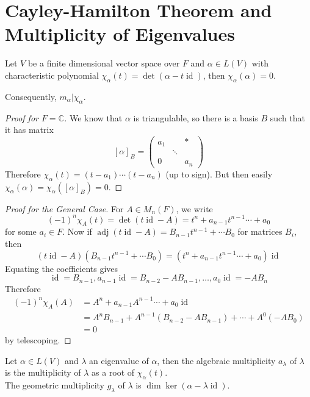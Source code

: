 \section{Cayley-Hamilton Theorem and Multiplicity of Eigenvalues}
\begin{theorem}
    Let $V$ be a finite dimensional vector space over $F$ and $\alpha\in L(V)$ with characteristic polynomial $\chi_\alpha(t)=\det(\alpha-t\operatorname{id})$, then $\chi_\alpha(\alpha)=0$.
\end{theorem}
Consequently, $m_\alpha|\chi_\alpha$.
\begin{proof}[Proof for $F=\mathbb C$]
    We know that $\alpha$ is triangulable, so there is a basis $B$ such that it has matrix
    $$[\alpha]_B=\begin{pmatrix}
        a_1&&\ast\\
        &\ddots&\\
        0&&a_n
    \end{pmatrix}$$
    Therefore $\chi_\alpha(t)=(t-a_1)\cdots (t-a_n)$ (up to sign).
    But then easily $\chi_\alpha(\alpha)=\chi_\alpha([\alpha]_B)=0$.
\end{proof}
\begin{proof}[Proof for the General Case]
    For $A\in M_n(F)$, we write
    $$(-1)^n\chi_A(t)=\det(t\operatorname{id}-A)=t^n+a_{n-1}t^{n-1}\cdots+a_0$$
    for some $a_i\in F$.
    Now if $\operatorname{adj}(t\operatorname{id}-A)=B_{n-1}t^{n-1}+\cdots B_0$ for matrices $B_i$, then
    $$(t\operatorname{id}-A)(B_{n-1}t^{n-1}+\cdots B_0)=(t^n+a_{n-1}t^{n-1}\cdots+a_0)\operatorname{id}$$
    Equating the coefficients gives
    $$\operatorname{id}=B_{n-1},a_{n-1}\operatorname{id}=B_{n-2}-AB_{n-1},\ldots,a_0\operatorname{id}=-AB_n$$
    Therefore
    \begin{align*}
        (-1)^n\chi_A(A)&=A^n+a_{n-1}A^{n-1}\cdots+a_0\operatorname{id}\\
        &=A^nB_{n-1}+A^{n-1}(B_{n-2}-AB_{n-1})+\cdots+A^0(-AB_0)\\
        &=0
    \end{align*}
    by telescoping.
\end{proof}
\begin{definition}
    Let $\alpha\in L(V)$ and $\lambda$ an eigenvalue of $\alpha$, then the algebraic multiplicity $a_\lambda$ of $\lambda$ is the multiplicity of $\lambda$ as a root of $\chi_\alpha(t)$.\\
    The geometric multiplicity $g_\lambda$ of $\lambda$ is $\dim\ker(\alpha-\lambda\operatorname{id})$.
\end{definition}
